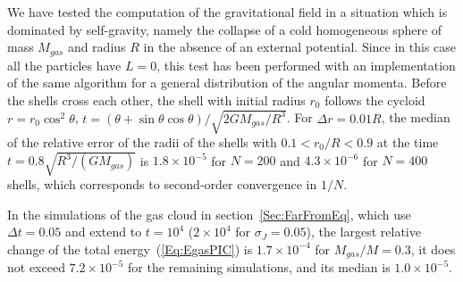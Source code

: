 We have tested the computation of the gravitational field in a situation which is dominated by self-gravity, namely the collapse of a cold homogeneous sphere of mass $M_{gas}$ and radius $R$ in the absence of an external potential. Since in this case all the particles have $L = 0$, this test has been performed with an implementation of the same algorithm for a general distribution of the angular momenta. Before the shells cross each other, the shell with initial radius $r_0$ follows the cycloid $r = r_0\cos^2\theta$, $t = (\theta + \sin\theta\cos\theta)/\sqrt{2GM_{gas}/R^3}$. For $\Delta r = 0.01 R$, the median of the relative error of the radii of the shells with $0.1 < r_0/R < 0.9$ at the time $t = 0.8\sqrt{R^3/(GM_{gas})}$ is $1.8\times 10^{-5}$ for $N = 200$ and $4.3\times 10^{-6}$ for $N = 400$ shells, which corresponds to second-order convergence in $1/N$.

In the simulations of the gas cloud in section~\ref{Sec:FarFromEq}, which use $\Delta t = 0.05$ and extend to $t = 10^4$ ($2\times 10^4$ for $\sigma_J = 0.05$), the largest relative change of the total energy~(\ref{Eq:EgasPIC}) is $1.7\times 10^{-4}$ for $M_{gas}/M = 0.3$, it does not exceed $7.2\times 10^{-5}$ for the remaining simulations, and its median is $1.0\times 10^{-5}$. 
